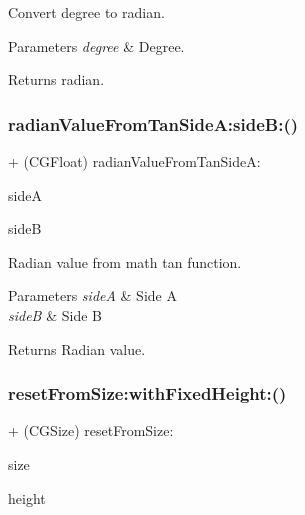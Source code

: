Convert degree to radian.


\begin{DoxyParams}{Parameters}
{\em degree} & Degree.\\
\hline
\end{DoxyParams}
\begin{DoxyReturn}{Returns}
radian. 
\end{DoxyReturn}
\mbox{\label{interface_math_a04cef0783d331a3cbe848d7e56b5b38e}} 
\subsubsection{\texorpdfstring{radian\+Value\+From\+Tan\+Side\+A\+:side\+B\+:()}{radianValueFromTanSideA:sideB:()}}
{\footnotesize\ttfamily + (C\+G\+Float) radian\+Value\+From\+Tan\+Side\+A\+: \begin{DoxyParamCaption}\item[{(C\+G\+Float)}]{sideA }\item[{sideB:(C\+G\+Float)}]{sideB }\end{DoxyParamCaption}}

Radian value from math \textquotesingle{}tan\textquotesingle{} function.


\begin{DoxyParams}{Parameters}
{\em sideA} & Side A \\
\hline
{\em sideB} & Side B\\
\hline
\end{DoxyParams}
\begin{DoxyReturn}{Returns}
Radian value. 
\end{DoxyReturn}
\mbox{\label{interface_math_a12894523c500bdb28f33b5b20a8f3666}} 
\subsubsection{\texorpdfstring{reset\+From\+Size\+:with\+Fixed\+Height\+:()}{resetFromSize:withFixedHeight:()}}
{\footnotesize\ttfamily + (C\+G\+Size) reset\+From\+Size\+: \begin{DoxyParamCaption}\item[{(C\+G\+Size)}]{size }\item[{withFixedHeight:(C\+G\+Float)}]{height }\end{DoxyParamCaption}}

